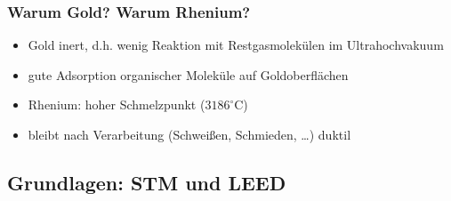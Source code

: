 \documentclass{beamer}
\begin{document}
\begin{frame}
\frametitle{Warum Gold? Warum Rhenium?}
\begin{itemize}\setlength{\itemsep}{+15pt}
 	\item Gold inert, d.h. wenig Reaktion mit Restgasmolekülen im Ultrahochvakuum
 	\item gute Adsorption organischer Moleküle auf Goldoberflächen
 \end{itemize}
 \vspace{1cm}
 \begin{itemize}\setlength{\itemsep}{+15pt}
  	\item Rhenium: hoher Schmelzpunkt ($3186^\circ$C)
  	\item bleibt nach Verarbeitung (Schweißen, Schmieden, \ldots) duktil
 \end{itemize}
\end{frame}



\subsection[Grundlagen]{Grundlagen: STM und LEED}
\end{document}
